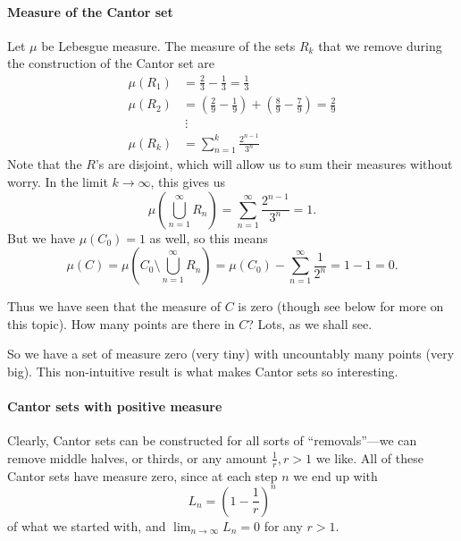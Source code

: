 \documentclass[12pt]{article}
\begin{document}
\paragraph{Measure of the Cantor set}
Let $\mu$ be Lebesgue measure.  The measure of the sets $R_k$ that we remove during the construction of the Cantor set are
\begin{align}
\mu(R_1) &= \frac{2}{3} - \frac{1}{3} = \frac{1}{3}\\
\mu(R_2) &= \left(\frac{2}{9} - \frac{1}{9}\right) + \left(\frac{8}{9} - \frac{7}{9}\right) = \frac{2}{9}\\
&\ \vdots\\
\mu(R_k) &= \sum_{n=1}^{k}\frac{2^{n-1}}{3^n}
\end{align}
Note that the $R$'s are disjoint, which will allow us to sum their measures without worry.  In the limit $k \to \infty$, this gives us
\begin{equation}
\mu\left(\bigcup_{n=1}^{\infty}R_n\right) = \sum_{n=1}^{\infty} \frac{2^{n-1}}{3^n} = 1.
\end{equation}
But we have $\mu(C_0) = 1$ as well, so this means
\begin{equation}
\mu(C) = \mu\left(C_0 \setminus \bigcup_{n=1}^{\infty}R_n\right) = \mu(C_0) - \sum_{n=1}^{\infty} \frac{1}{2^n} = 1-1 = 0.
\end{equation}

Thus we have seen that the measure of $C$ is zero (though see below for more on this topic).  How many points are there in $C$?  
Lots, as we shall see.


So we have a set of measure zero (very tiny) with uncountably many points (very big).  This non-intuitive result is what 
makes Cantor sets so interesting.

\paragraph{Cantor sets with positive measure}
Clearly, Cantor sets can be constructed for all sorts of ``removals''---we can remove middle halves, or thirds, or any amount 
$\frac{1}{r}, r>1$ we like.  All of these Cantor sets have measure zero, since at each step $n$ we end up with
\begin{equation}
L_n = \left(1 - \frac{1}{r}\right)^n
\end{equation}
of what we started with, and $\lim_{n \to \infty} L_n = 0$ for any $r>1$.
\end{document}
